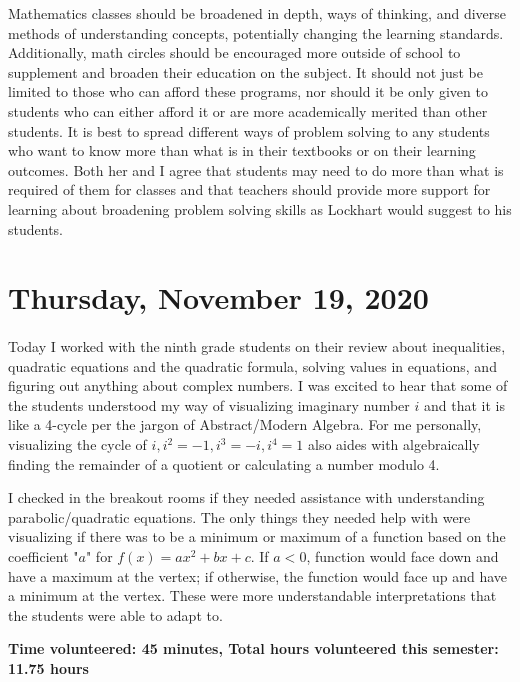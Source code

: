 \documentclass{article}
\begin{document}
Mathematics classes should be broadened in depth, ways of thinking, and diverse methods of understanding concepts, potentially changing the learning standards. Additionally, math circles should be encouraged more outside of school to supplement and broaden their education on the subject. It should not just be limited to those who can afford these programs, nor should it be only given to students who can either afford it or are more academically merited than other students. It is best to spread different ways of problem solving to any students who want to know more than what is in their textbooks or on their learning outcomes. Both her and I agree that students may need to do more than what is required of them for classes and that teachers should provide more support for learning about broadening problem solving skills as Lockhart would suggest to his students.

\section{Thursday, November 19, 2020}

\paragraph{}Today I worked with the ninth grade students on their review about inequalities, quadratic equations and the quadratic formula, solving values in equations, and figuring out anything about complex numbers. I was excited to hear that some of the students understood my way of visualizing imaginary number $i$ and that it is like a 4-cycle per the jargon of Abstract/Modern Algebra. For me personally, visualizing the cycle of $i, i^2 = -1, i^3 = -i, i^4 = 1$ also aides with algebraically finding the remainder of a quotient or calculating a number modulo 4. 

I checked in the breakout rooms if they needed assistance with understanding parabolic/quadratic equations. The only things they needed help with were visualizing if there was to be a minimum or maximum of a function based on the coefficient "$a$" for $f(x) = ax^2 + bx + c$. If $a<0$, function would face down and have a maximum at the vertex; if otherwise, the function would face up and have a minimum at the vertex. These were more understandable interpretations that the students were able to adapt to. 

\textbf{Time volunteered: 45 minutes, Total hours volunteered this semester: 11.75 hours}
\end{document}
